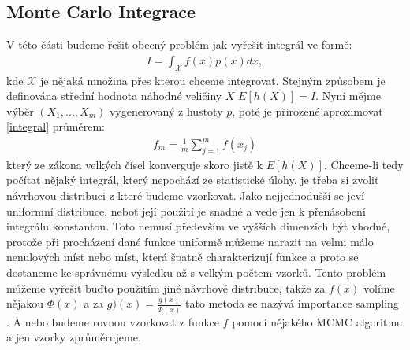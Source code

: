 \documentclass[czech,master,public,dept470,male,cpdeclaration,oneside, python]{diploma}
\begin{document}
\subsection{Monte Carlo Integrace}
V této části budeme řešit obecný problém jak vyřešit integrál ve formě:
\begin{align} \label{integral}
	I = \int_{\mathcal{X}} f(x)p(x) dx,
\end{align}
kde $\mathcal{X}$ je nějaká množina přes kterou chceme integrovat. Stejným způsobem je definována střední hodnota náhodné veličiny $X$ $E[h(X)] = I$.  Nyní mějme výběr $(X_1, ..., X_m)$ vygenerovaný z hustoty $p$, poté je přirozené aproximovat \ref{integral} průměrem:
\begin{align}
	f_m = \frac{1}{m}\sum_{j=1}^{m}f(x_j)
\end{align}
který ze zákona velkých čísel konverguje skoro jistě k $E[h(X)]$. 
Chceme-li tedy počítat nějaký integrál, který nepochází ze statistické úlohy, je třeba si zvolit  návrhovou distribuci z které budeme vzorkovat. Jako nejjednodušší se jeví uniformní distribuce, neboť její použití je snadné a vede jen k přenásobení integrálu konstantou. Toto nemusí především ve vyšších dimenzích být vhodné, protože při procházení dané funkce uniformě můžeme narazit na velmi málo nenulových míst nebo míst, která špatně charakterizují funkce a proto se dostaneme ke správnému výsledku až s velkým počtem vzorků. Tento problém můžeme vyřešit buďto použitím jiné návrhové distribuce, takže za $f(x)$ volíme nějakou $\Phi(x)$ a za $\overset{~}{g)}(x) = \frac{g(x)}{\Phi(x)}$ tato metoda se nazývá importance sampling \cite{robert2004monte}. A nebo budeme rovnou vzorkovat z funkce $f$ pomocí nějakého MCMC algoritmu a jen vzorky zprůměrujeme. \par
\end{document}
